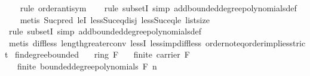 \begin{isabellebody}
%
\isadelimproof
\ \ %
\endisadelimproof
%
\isatagproof
{}\isamarkupfalse%
\ {\isacharparenleft}{\kern0pt}rule\ order{\isacharunderscore}{\kern0pt}antisym{\isacharparenright}{\kern0pt}\isanewline
\ \ \isamarkupfalse%
\ {\isacharparenleft}{\kern0pt}rule\ subsetI{\isacharcomma}{\kern0pt}\ simp\ add{\isacharcolon}{\kern0pt}bounded{\isacharunderscore}{\kern0pt}degree{\isacharunderscore}{\kern0pt}polynomials{\isacharunderscore}{\kern0pt}def{\isacharparenright}{\kern0pt}\ \isanewline
\ \ \isamarkupfalse%
\ {\isacharparenleft}{\kern0pt}metis\ Suc{\isacharunderscore}{\kern0pt}pred\ leI\ less{\isacharunderscore}{\kern0pt}Suc{\isacharunderscore}{\kern0pt}eq{\isacharunderscore}{\kern0pt}{}{\isacharunderscore}{\kern0pt}disj\ less{\isacharunderscore}{\kern0pt}Suc{\isacharunderscore}{\kern0pt}eq{\isacharunderscore}{\kern0pt}le\ list{\isachardot}{\kern0pt}size{\isacharparenleft}{\kern0pt}{}{\isacharparenright}{\kern0pt}{\isacharparenright}{\kern0pt}\isanewline
\ \ \isamarkupfalse%
\ {\isacharparenleft}{\kern0pt}rule\ subsetI{\isacharcomma}{\kern0pt}\ simp\ add{\isacharcolon}{\kern0pt}bounded{\isacharunderscore}{\kern0pt}degree{\isacharunderscore}{\kern0pt}polynomials{\isacharunderscore}{\kern0pt}def{\isacharparenright}{\kern0pt}\ \isanewline
\ \ \isamarkupfalse%
\ {\isacharparenleft}{\kern0pt}metis\ diff{\isacharunderscore}{\kern0pt}less\ length{\isacharunderscore}{\kern0pt}greater{\isacharunderscore}{\kern0pt}{}{\isacharunderscore}{\kern0pt}conv\ lessI\ less{\isacharunderscore}{\kern0pt}imp{\isacharunderscore}{\kern0pt}diff{\isacharunderscore}{\kern0pt}less\ order{\isachardot}{\kern0pt}not{\isacharunderscore}{\kern0pt}eq{\isacharunderscore}{\kern0pt}order{\isacharunderscore}{\kern0pt}implies{\isacharunderscore}{\kern0pt}strict{\isacharparenright}{\kern0pt}%
\endisatagproof
{\isafoldproof}%
%
\isadelimproof
\isanewline
%
\endisadelimproof
\isanewline
{}\isamarkupfalse%
\ fin{\isacharunderscore}{\kern0pt}degree{\isacharunderscore}{\kern0pt}bounded{\isacharcolon}{\kern0pt}\isanewline
\ \ \ {\isachardoublequoteopen}ring\ F{\isachardoublequoteclose}\isanewline
\ \ \ {\isachardoublequoteopen}finite\ {\isacharparenleft}{\kern0pt}carrier\ F{\isacharparenright}{\kern0pt}{\isachardoublequoteclose}\isanewline
\ \ \ {\isachardoublequoteopen}finite\ {\isacharparenleft}{\kern0pt}bounded{\isacharunderscore}{\kern0pt}degree{\isacharunderscore}{\kern0pt}polynomials\ F\ n{\isacharparenright}{\kern0pt}{\isachardoublequoteclose}\isanewline

\end{isabellebody}
